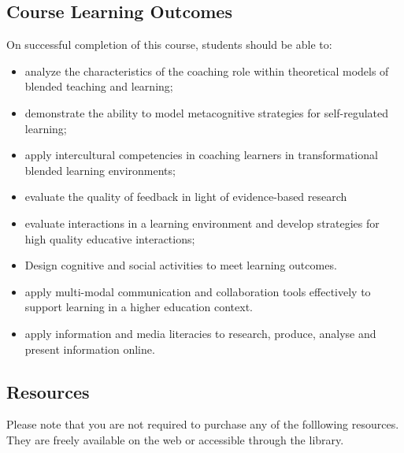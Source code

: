 \documentclass[
]{book}
\providecommand{\tightlist}{%
  \setlength{\itemsep}{0pt}\setlength{\parskip}{0pt}}
\begin{document}
\hypertarget{course-learning-outcomes}{%
\subsection*{Course Learning Outcomes}\label{course-learning-outcomes}}

On successful completion of this course, students should be able to:

\begin{itemize}
\tightlist
\item
  analyze the characteristics of the coaching role within theoretical models of blended teaching and learning;
\item
  demonstrate the ability to model metacognitive strategies for self-regulated learning;
\item
  apply intercultural competencies in coaching learners in transformational blended learning environments;
\item
  evaluate the quality of feedback in light of evidence-based research
\item
  evaluate interactions in a learning environment and develop strategies for high quality educative interactions;
\item
  Design cognitive and social activities to meet learning outcomes.
\item
  apply multi-modal communication and collaboration tools effectively to support learning in a higher education context.
\item
  apply information and media literacies to research, produce, analyse and present information online.
\end{itemize}

\hypertarget{resources}{%
\subsection*{Resources}\label{resources}}

Please note that you are not required to purchase any of the folllowing resources. They are freely available on the web or accessible through the library.
\end{document}
